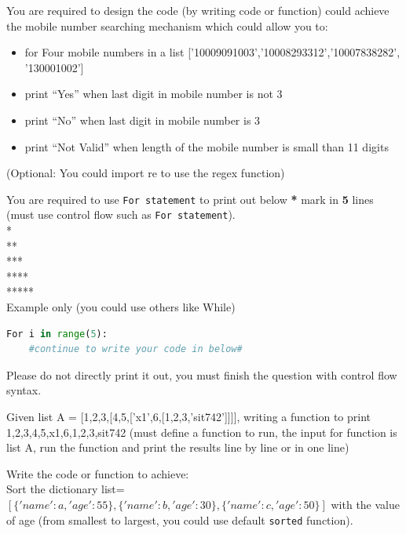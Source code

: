 \documentclass[a4paper]{article}
\begin{document}
    \begin{answer}[Question 1.3]
    You are required to design the code (by writing code or function) could achieve the mobile number searching mechanism which could allow you to:
    \begin{itemize}
        \item for Four mobile numbers in a list ['10009091003','10008293312','10007838282', '130001002']
        \item print “Yes” when last digit in mobile number is not 3
        \item print “No” when last digit in mobile number is 3
        \item print “Not Valid” when length of the mobile number is small than 11 digits
    \end{itemize}
    (Optional: You could import re to use the regex function)
    \end{answer}
    
    \begin{answer}[Question 1.4]
    You are required to use \texttt{For statement} to 
    print out below \textbf{*} mark in \textbf{5} lines 
    (must use control flow such as \texttt{For statement}). \\
    
    * \\
    ** \\
    *** \\
    **** \\
    ***** \\
   
    Example only (you could use others like While)
    \begin{lstlisting}[language=Python]
For i in range(5):
    #continue to write your code in below#
    \end{lstlisting}
    Please do not directly print it out, you must finish the question with control flow syntax.
    \end{answer}
    
    \begin{answer}[Question 1.5]
    Given list A = [1,2,3,[4,5,['x1',6,[1,2,3,'sit742']]]], 
    writing a function to print 1,2,3,4,5,x1,6,1,2,3,sit742 (must define a function to run, the input for function is list A, run the function and print the results line by line or in one line)
    \end{answer}
    
    
    \begin{answer}[Question 1.6]
    Write the code or function to achieve: \\
    Sort the dictionary list=$[\{'name':a,'age':55\},\{'name':b,'age':30\},\{'name':c,'age':50\}]$ with the value of age (from smallest to largest, you could use default \texttt{sorted} function).
    \end{answer}
    
\end{document}
